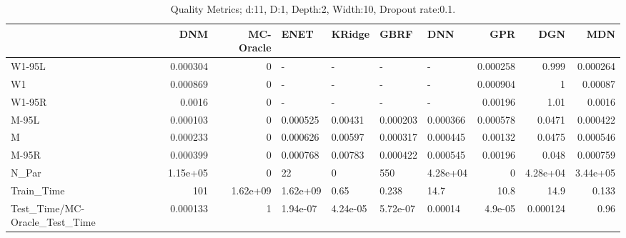 \begin{table}
\centering
\caption{Quality Metrics; d:11, D:1, Depth:2, Width:10, Dropout rate:0.1.}
\begin{tabular}{lrrllllrrr}
\toprule
{} &      DNM &  MC-Oracle &     ENET &   KRidge &     GBRF &      DNN &      GPR &      DGN &      MDN \\
\midrule
W1-95L                        & 0.000304 &          0 &        - &        - &        - &        - & 0.000258 &    0.999 & 0.000264 \\
W1                            & 0.000869 &          0 &        - &        - &        - &        - & 0.000904 &        1 &  0.00087 \\
W1-95R                        &   0.0016 &          0 &        - &        - &        - &        - &  0.00196 &     1.01 &   0.0016 \\
M-95L                         & 0.000103 &          0 & 0.000525 &  0.00431 & 0.000203 & 0.000366 & 0.000578 &   0.0471 & 0.000422 \\
M                             & 0.000233 &          0 & 0.000626 &  0.00597 & 0.000317 & 0.000445 &  0.00132 &   0.0475 & 0.000546 \\
M-95R                         & 0.000399 &          0 & 0.000768 &  0.00783 & 0.000422 & 0.000545 &  0.00196 &    0.048 & 0.000759 \\
N\_Par                         & 1.15e+05 &          0 &       22 &        0 &      550 & 4.28e+04 &        0 & 4.28e+04 & 3.44e+05 \\
Train\_Time                    &      101 &   1.62e+09 & 1.62e+09 &     0.65 &    0.238 &     14.7 &     10.8 &     14.9 &    0.133 \\
Test\_Time/MC-Oracle\_Test\_Time & 0.000133 &          1 & 1.94e-07 & 4.24e-05 & 5.72e-07 &  0.00014 &  4.9e-05 & 0.000124 &     0.96 \\
\bottomrule
\end{tabular}
\end{table}
